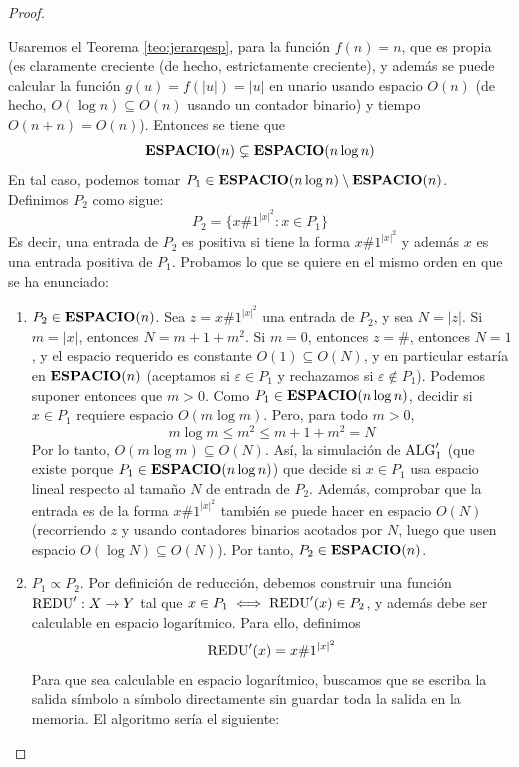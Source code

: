 \begin{ejercicio}
\begin{proof}
\begin{enumerate}
            Usaremos el Teorema \ref{teo:jerarqesp}, para la 
            función $f(n) = n$, que es propia (es claramente creciente (de hecho, estrictamente creciente), 
            y además se puede calcular la función $g(u) = f(|u|) = |u|$ en unario usando espacio $O(n)$ (de hecho, $O(\log n) \subseteq O(n)$ usando un contador binario) y tiempo $O(n + n) = O(n)$). Entonces se tiene que 
            $$\textbf{ESPACIO}(n) \subsetneq \textbf{ESPACIO}(n \log n)$$
            En tal caso, podemos tomar $P_1 \in \textbf{ESPACIO}(n \log n) \setminus \textbf{ESPACIO}(n)$. Definimos $P_2$ como sigue:
            $$P_2 = \{x \# 1^{|x|^2} : x \in P_1\}$$
            Es decir, una entrada de $P_2$ es positiva si tiene la forma $x \# 1^{|x|^2}$ y además 
            $x$ es una entrada positiva de $P_1$. Probamos lo que se quiere en el mismo orden en que se ha enunciado:
            \begin{enumerate}
                \item $P_2 \in \textbf{ESPACIO}(n)$. Sea $z = x \# 1^{|x|^2}$ una entrada de $P_2$, y sea $N = |z|$. 
                Si $m = |x|$, entonces $N = m + 1 + m^2$. Si $m = 0$, entonces $z = \#$, entonces $N = 1$, y el espacio requerido es constante
                $O(1) \subseteq O(N)$, y en particular estaría en $\textbf{ESPACIO}(n)$ (aceptamos si $\varepsilon \in P_1$ y rechazamos si $\varepsilon \notin P_1$). Podemos suponer entonces 
                que $m > 0$. Como $P_1 \in \textbf{ESPACIO}(n \log n)$, decidir si $x \in P_1$
                requiere espacio $O(m \log m)$. Pero, para todo $m > 0$,
                $$m \log m \leq m^2 \leq m + 1 + m^2 = N$$
                Por lo tanto, $O(m \log m) \subseteq O(N)$. Así, la simulación de $\text{ALG}'_1$ (que existe 
                porque $P_1 \in \textbf{ESPACIO}(n \log n)$) que decide si $x \in P_1$ usa espacio lineal
                respecto al tamaño $N$ de entrada de $P_2$. Además, comprobar que la entrada es de la forma 
                $x \# 1^{|x|^2}$ también se puede hacer en espacio $O(N)$ (recorriendo $z$ y usando contadores binarios acotados por $N$, luego que usen espacio
                $O(\log N) \subseteq O(N)$). Por tanto, $P_2 \in \textbf{ESPACIO}(n)$.
                \item $P_1 \propto P_2$. Por definición de reducción, debemos construir una función 
                $\text{REDU}' : X \to Y$ tal que $x \in P_1 \iff \text{REDU}'(x) \in P_2$, y además debe ser 
                calculable en espacio logarítmico. Para ello, definimos $$\text{REDU}'(x) = x \# 1^{|x|^2}$$
                Para que sea calculable en espacio logarítmico, buscamos que se escriba la salida símbolo a símbolo
                directamente sin guardar toda la salida en la memoria. El algoritmo sería el siguiente:

\end{enumerate}
\end{enumerate}
\end{proof}
\end{ejercicio}
